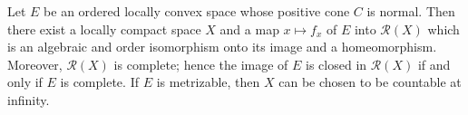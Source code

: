 Let $E$ be an ordered locally convex space whose positive cone $C$ is normal. Then there exist a locally compact space $X$ and a map $x \mapsto f_x$ of $E$ into $\mathcal{R}(X)$ which is an algebraic and order isomorphism onto its image and a homeomorphism. Moreover, $\mathcal{R}(X)$ is complete; hence the image of $E$ is closed in $\mathcal{R}(X)$ if and only if $E$ is complete. If $E$ is metrizable, then $X$ can be chosen to be countable at infinity.
